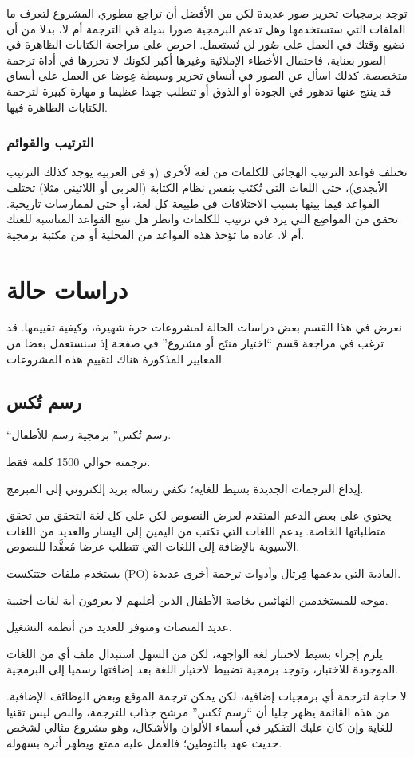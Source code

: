 توجد برمجيات تحرير صور عديدة لكن من الأفضل أن تراجع مطوري المشروع لتعرف
ما الملفات التي ستستخدمها وهل تدعم البرمجية صورا بديلة في الترجمة أم
لا، بدلا من أن تضيع وقتك في العمل على صُور لن تُستعمل. احرص على مراجعة
الكتابات الظاهرة في الصور بعناية، فاحتمال الأخطاء الإملائية وغيرها أكبر
لكونك لا تحررها في أداة ترجمة متخصصة. كذلك اسأل عن الصور في أنساق تحرير
وسيطة عِوضا عن العمل على أنساق قد ينتج عنها تدهور في الجودة أو الذوق أو
تتطلب جهدا عظيما و مهارة كبيرة لترجمة الكتابات الظاهرة فيها.

\subsection{الترتيب والقوائم}
تختلف قواعد الترتيب الهجائي للكلمات من لغة لأخرى (و في العربية يوجد كذلك
الترتيب الأبجدي)، حتى اللغات التي تُكتَب بنفس نظام الكتابة (العربي أو
اللاتيني مثلا) تختلف القواعد فيما بينها بسبب الاختلافات في طبيعة كل
لغة، أو حتى لممارسات تاريخية. تحقق من المواضِع التي يرد في ترتيب
للكلمات وانظر هل تتبع القواعد المناسبة للغتك أم لا. عادة ما تؤخذ هذه
القواعد من المحلية أو من مكتبة برمجية.

\chapter{دراسات حالة}
نعرض في هذا القسم بعض دراسات الحالة لمشروعات حرة شهيرة، وكيفية تقييمها.
قد ترغب في مراجعة قسم “اختيار منتَج أو مشروع” في صفحة
\at[ref:36346325] إذ سنستعمل بعضا من المعايير المذكورة هناك
لتقييم هذه المشروعات.

\section[ref:34376426]{رسم تُكس}
“رسم تُكس” برمجية رسم للأطفال.

\startitemize[1]
\item ترجمته حوالي 1500 كلمة فقط.
\item إيداع الترجمات الجديدة بسيط للغاية؛ تكفي رسالة بريد إلكتروني إلى
المبرمج.
\item يحتوي على بعض الدعم المتقدم لعرض النصوص لكن على كل لغة التحقق من
تحقق متطلباتها الخاصة. يدعم اللغات التي تكتب من اليمين إلى اليسار
والعديد من اللغات الآسيوية بالإضافة إلى اللغات التي تتطلب عرضا مُعقَّدا
للنصوص.
\item يستخدم ملفات جتتكست (PO) العادية التي يدعمها فِرتال وأدوات ترجمة
أخرى عديدة.
\item موجه للمستخدمين النهائيين بخاصة الأطفال الذين أغلبهم لا يعرفون أية
لغات أجنبية.
\item عديد المنصات ومتوفر للعديد من أنظمة التشغيل.
\item يلزم إجراء بسيط لاختبار لغة الواجهة، لكن من السهل استبدال ملف أي
من اللغات الموجودة للاختبار، وتوجد برمجية تضبيط لاختيار اللغة بعد
إضافتها رسميا إلى البرمجية.
\item لا حاجة لترجمة أي برمجيات إضافية، لكن يمكن ترجمة الموقع وبعض
الوظائف الإضافية.
\stopitemize
من هذه القائمة يظهر جليا أن “رسم تُكس” مرشح جذاب للترجمة، والنص ليس
تقنيا للغاية وإن كان عليك التفكير في أسماء الألوان والأشكال، وهو مشروع
مثالي لشخص حديث عهد بالتوطين؛ فالعمل عليه ممتع ويظهر أثره بسهوله.

